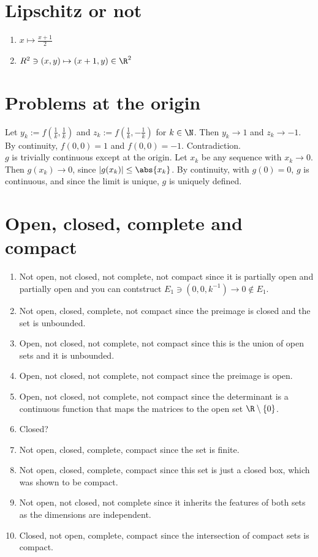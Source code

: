 \documentclass{article}
\begin{document}

\section{Lipschitz or not}
\begin{enumerate}[label=(\alph*)]
    \item $x \mapsto \frac{x + 1}{2}$
    \item $R^2 \ni (x, y) \mapsto (x + 1, y) \in \R^2$
\end{enumerate}

\section{Problems at the origin}
Let $y_k := f\left(\frac{1}{k}, \frac{1}{k}\right)$ and $z_k := f\left(\frac{1}{k}, -\frac{1}{k}\right)$ for $k \in \N$. Then $y_k \to 1$ and $z_k \to -1$. By continuity, $f(0, 0) = 1$ and $f(0, 0) = -1$. Contradiction. \\
$g$ is trivially continuous except at the origin. Let $x_k$ be any sequence with $x_k \to 0$. Then $g(x_k) \to 0$, since $|g(x_k)| \leq \abs{x_k}$. By continuity, with $g(0) = 0$, $g$ is continuous, and since the limit is unique, $g$ is uniquely defined. 


\section{Open, closed, complete and compact}
\begin{enumerate}
    \item Not open, not closed, not complete, not compact since it is partially open and partially open and you can contstruct $E_1 \ni (0, 0, k^{-1}) \to 0 \notin E_1$. 
    \item Not open, closed, complete, not compact since the preimage is closed and the set is unbounded.
    \item Open, not closed, not complete, not compact since this is the union of open sets and it is unbounded. 
    \item Open, not closed, not complete, not compact since the preimage is open. 
    \item Open, not closed, not complete, not compact since the determinant is a continuous function that maps the matrices to the open set $\R \setminus \{0\}$. 
    \item Closed?
    \item Not open, closed, complete, compact since the set is finite. 
    \item Not open, closed, complete, compact since this set is just a closed box, which was shown to be compact. 
    \item Not open, not closed, not complete since it inherits the features of both sets as the dimensions are independent. 
    \item Closed, not open, complete, compact since the intersection of compact sets is compact. 
\end{enumerate}
\end{document}
